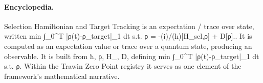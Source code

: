 \paragraph{Encyclopedia.}
Selection Hamiltonian and Target Tracking is an expectation / trace over state, written min ∫\_0\textasciicircum{}T |ρ(t)-ρ\_target|\_1 dt s.t. ρ = -(i)/(ħ)[H\_sel,ρ] + D[ρ].. It is computed as an expectation value or trace over a quantum state, producing an observable. It is built from ħ, ρ, H\_, D, defining min ∫\_0\textasciicircum{}T |ρ(t)-ρ\_target|\_1 dt s.t. ρ. Within the Trawin Zero Point registry it serves as one element of the framework's mathematical narrative.

